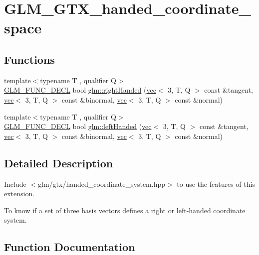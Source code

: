 \hypertarget{group__gtx__handed__coordinate__space}{}\section{G\+L\+M\+\_\+\+G\+T\+X\+\_\+handed\+\_\+coordinate\+\_\+space}
\label{group__gtx__handed__coordinate__space}
\subsection*{Functions}
\begin{DoxyCompactItemize}
\item 
{\footnotesize template$<$typename T , qualifier Q$>$ }\\\mbox{\hyperlink{setup_8hpp_ab2d052de21a70539923e9bcbf6e83a51}{G\+L\+M\+\_\+\+F\+U\+N\+C\+\_\+\+D\+E\+CL}} bool \mbox{\hyperlink{group__gtx__handed__coordinate__space_ga99386a5ab5491871b947076e21699cc8}{glm\+::right\+Handed}} (\mbox{\hyperlink{structglm_1_1vec}{vec}}$<$ 3, T, Q $>$ const \&tangent, \mbox{\hyperlink{structglm_1_1vec}{vec}}$<$ 3, T, Q $>$ const \&binormal, \mbox{\hyperlink{structglm_1_1vec}{vec}}$<$ 3, T, Q $>$ const \&normal)
\item 
{\footnotesize template$<$typename T , qualifier Q$>$ }\\\mbox{\hyperlink{setup_8hpp_ab2d052de21a70539923e9bcbf6e83a51}{G\+L\+M\+\_\+\+F\+U\+N\+C\+\_\+\+D\+E\+CL}} bool \mbox{\hyperlink{group__gtx__handed__coordinate__space_ga6f1bad193b9a3b048543d1935cf04dd3}{glm\+::left\+Handed}} (\mbox{\hyperlink{structglm_1_1vec}{vec}}$<$ 3, T, Q $>$ const \&tangent, \mbox{\hyperlink{structglm_1_1vec}{vec}}$<$ 3, T, Q $>$ const \&binormal, \mbox{\hyperlink{structglm_1_1vec}{vec}}$<$ 3, T, Q $>$ const \&normal)
\end{DoxyCompactItemize}


\subsection{Detailed Description}
Include $<$glm/gtx/handed\+\_\+coordinate\+\_\+system.\+hpp$>$ to use the features of this extension.

To know if a set of three basis vectors defines a right or left-\/handed coordinate system. 

\subsection{Function Documentation}
\mbox{\label{group__gtx__handed__coordinate__space_ga6f1bad193b9a3b048543d1935cf04dd3}} 
